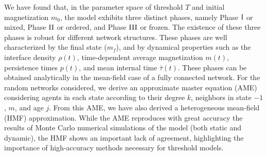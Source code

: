 	We have found that, in the parameter space of threshold $T$ and initial magnetization $m_0$, the model exhibits three distinct phases, namely Phase ${\rm I}$ or mixed, Phase ${\rm II}$ or ordered, and Phase ${\rm III}$ or frozen. The existence of these three phases is robust for different network structures.
	These phases are well characterized by the final state ($m_f$), and by dynamical properties such as the interface density $\rho(t)$, time-dependent average magnetization $m(t)$, persistence times $p(t)$, and mean internal time $\bar{\tau}(t)$. These phases can be obtained analytically in the mean-field case of a fully connected network. For the random networks considered, we derive an approximate master equation (AME) \cite{gleeson-2013,Abella-2022-AME} considering agents in each state according to their degree $k$,  neighbors in state $-1$, $m$, and age $j$. From this AME, we have also derived a heterogeneous mean-field (HMF) approximation. While the AME reproduces with great accuracy the results of Monte Carlo numerical simulations of the model (both static and dynamic), the HMF shows an important lack of agreement, highlighting the importance of high-accuracy methods necessary for threshold models. 
	
	
